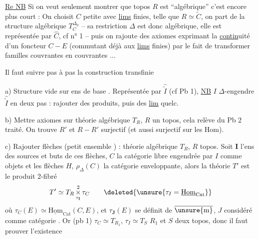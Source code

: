 

\uline{Re NB} Si on veut seulement montrer que  topos $R$ est ``algébrique'' c'est encore plus court : On choisit $C$ petite avec \uline{lims} finies, telle que $R\simeq\widetilde C$,  on  part de la structure algébrique $T_C^{\Delta{}_0}$ -- sa restriction \unsure{,} $\Delta$ est donc algébrique, elle est représentée par $\widehat C$, cf  n° 1 -- puis on rajoute des axiomes exprimant la \uline{contin}uité d'un foncteur $C-E$ (commutant déjà aux \uline{lims} finies) par le fait de transformer familles couvrantes en  couvrantes ...


 Il faut suivre pas à pas la construction transfinie

a) Structure vide sur ens de base . Représentée par $\widehat{\widetilde I}$ (cf Pb 1),   \uline{NB} $I$ $\Delta$-engendre $\widehat{\widetilde I}$ en deux pas : rajouter des produits, puis des \uline{lim} quelc.

b)  Mettre axiomes sur théorie algébrique $T_R$, $R$ un topos, cela relève du Pb 2 traité. On trouve $R'$ et $R-R'$  surjectif (et aussi surjectif sur les Hom).

c) Rajouter flèches (petit ensemble ) :  théorie algébrique $T_R$, $R$  topos.  Soit  $\mathbf I$  l'ens des sources et buts de ces flèches, $C$ la catégorie libre engendrée par  $I$ comme objets et les flèches $H$, $\rho_\Delta(C)$ la catégorie enveloppante, alors la théorie $T'$ est le produit 2-fibré
\[
 T'\simeq T_R\mathop{\times}^{2}_{\tau_{\mathbf I}}\tau_C
 \qquad \deleted{\unsure{\tau_I=\underline{\mathrm{Hom}}_{\mathrm{Cat}}}}
\]
où $\tau_C(E)\simeq\underline{\mathrm{Hom}}_{\mathrm{Cat}}(C,E)$, et $\tau_{\mathbf J}(E)$ se définit de $\overline{\unsure{\mathrm m}}$, $J$ considéré comme catégorie . Or (pb 1) $\tau_C\simeq T_{R_1}$, $\tau_I\simeq T_S$ $R_1$ et $S$ deux topos, donc il faut prouver l'existence
